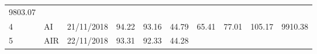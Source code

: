 \documentclass[
  11pt,
]{article}
\begin{document}
\begin{longtable}[]{@{}llllllllll@{}}
\begin{minipage}[t]{0.09\columnwidth}
9803.07\strut
\end{minipage}\tabularnewline
\begin{minipage}[t]{0.05\columnwidth}\raggedright
4\strut
\end{minipage} & \begin{minipage}[t]{0.07\columnwidth}\raggedright
AI\strut
\end{minipage} & \begin{minipage}[t]{0.11\columnwidth}\raggedright
21/11/2018\strut
\end{minipage} & \begin{minipage}[t]{0.07\columnwidth}\raggedright
94.22\strut
\end{minipage} & \begin{minipage}[t]{0.07\columnwidth}\raggedright
93.16\strut
\end{minipage} & \begin{minipage}[t]{0.07\columnwidth}\raggedright
44.79\strut
\end{minipage} & \begin{minipage}[t]{0.07\columnwidth}\raggedright
65.41\strut
\end{minipage} & \begin{minipage}[t]{0.07\columnwidth}\raggedright
77.01\strut
\end{minipage} & \begin{minipage}[t]{0.08\columnwidth}\raggedright
105.17\strut
\end{minipage} & \begin{minipage}[t]{0.09\columnwidth}\raggedright
9910.38\strut
\end{minipage}\tabularnewline
\begin{minipage}[t]{0.05\columnwidth}\raggedright
5\strut
\end{minipage} & \begin{minipage}[t]{0.07\columnwidth}\raggedright
AIR\strut
\end{minipage} & \begin{minipage}[t]{0.11\columnwidth}\raggedright
22/11/2018\strut
\end{minipage} & \begin{minipage}[t]{0.07\columnwidth}\raggedright
93.31\strut
\end{minipage} & \begin{minipage}[t]{0.07\columnwidth}\raggedright
92.33\strut
\end{minipage} & \begin{minipage}[t]{0.07\columnwidth}\raggedright
44.28\strut
\end{minipage} & \begin{minipage}[t]{0.07\columnwidth}\raggedright

\end{minipage}
\end{longtable}
\end{document}
